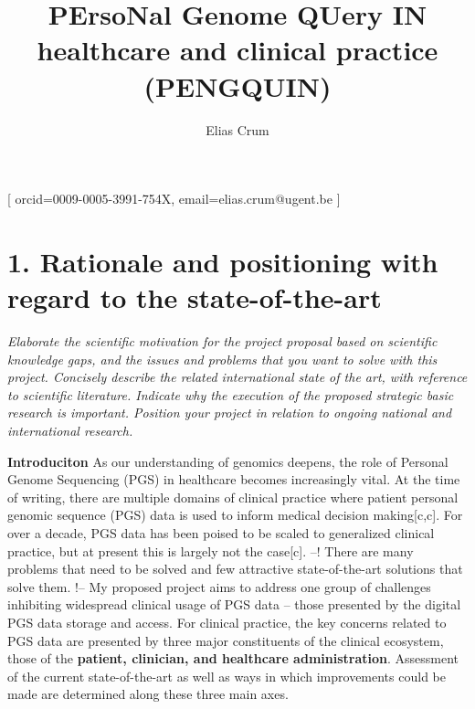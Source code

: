 \documentclass[11pt]{article}
\begin{document}
\title{PErsoNal Genome QUery IN healthcare and clinical practice (PENGQUIN)}
\author[1,2]{Elias Crum}[
orcid=0009-0005-3991-754X,
email=elias.crum@ugent.be
]

\maketitle

\section{1. Rationale and positioning with regard to the state-of-the-art}
\textit{Elaborate the scientific motivation for the project proposal based on scientific knowledge gaps, and the issues and problems that you want to solve with this project. Concisely describe the related international state of the art, with reference to scientific literature. Indicate why the execution of the proposed strategic basic research is important. Position your project in relation to ongoing national and international research.} 



\textbf{Introduciton}
As our understanding of genomics deepens, the role of Personal Genome Sequencing (PGS) in healthcare becomes increasingly vital. 
At the time of writing, there are multiple domains of clinical practice where patient personal genomic sequence (PGS) data is used to inform medical decision making[c,c]. 
For over a decade, PGS data has been poised to be scaled to generalized clinical practice, but at present this is largely not the case[c]. 
--! There are many problems that need to be solved and few attractive state-of-the-art solutions that solve them. !--
My proposed project aims to address one group of challenges inhibiting widespread clinical usage of PGS data -- those presented by the digital PGS data storage and access. 
For clinical practice, the key concerns related to PGS data are presented by three major constituents of the clinical ecosystem, those of the \textbf{patient, clinician, and healthcare administration}. 
Assessment of the current state-of-the-art as well as ways in which improvements could be made are determined along these three main axes.
\end{document}
